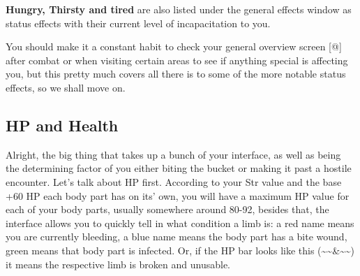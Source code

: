 \textbf{Hungry, Thirsty and tired} are also listed under the general effects window as status effects with their current level of incapacitation to you.

You should make it a constant habit to check your general overview screen [@] after combat or when visiting certain areas to see if anything special is affecting you, but this pretty much covers all there is to some of the more notable status effects, so we shall move on.

\subsection{HP and Health}

Alright, the big thing that takes up a bunch of your interface, as well as being the determining factor of you either biting the bucket or making it past a hostile encounter. Let's talk about HP first. According to your Str value and the base +60 HP each body part has on its' own, you will have a maximum HP value for each of your body parts, usually somewhere around 80-92, besides that, the interface allows you to quickly tell in what condition a limb is: a red name means you are currently bleeding, a blue name means the body part has a bite wound, green means that body part is infected. Or, if the HP bar looks like this (\~{}\~{}\&\~{}\~{}) it means the respective limb is broken and unusable.

